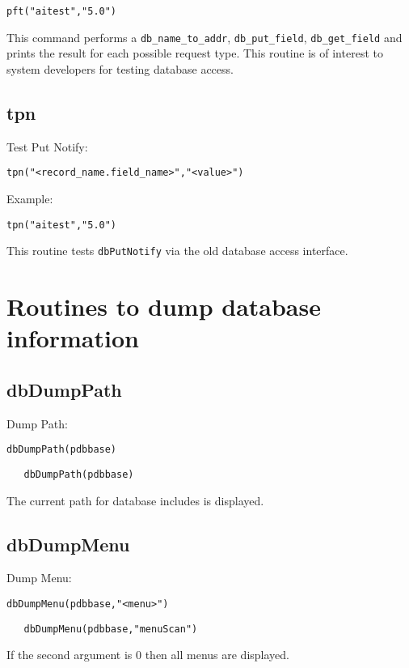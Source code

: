 \begin{verbatim}pft("aitest","5.0")
\end{verbatim}This command performs a \verb|db_name_to_addr|, \verb|db_put_field|, \verb|db_get_field| and prints the result for each 
possible request type. This routine is of interest to system developers for testing database access.

\subsection{tpn}

Test Put Notify:

\begin{verbatim}tpn("<record_name.field_name>","<value>")
\end{verbatim}Example:

\begin{verbatim}tpn("aitest","5.0")
\end{verbatim}This routine tests \verb|dbPutNotify| via the old database access interface.

\section{Routines to dump database information}

\subsection{dbDumpPath}

Dump Path:

\begin{verbatim}dbDumpPath(pdbbase)
\end{verbatim}

\begin{verbatim}   dbDumpPath(pdbbase)
\end{verbatim}The current path for database includes is displayed.

\subsection{dbDumpMenu}

Dump Menu:

\begin{verbatim}dbDumpMenu(pdbbase,"<menu>")
\end{verbatim}

\begin{verbatim}   dbDumpMenu(pdbbase,"menuScan")
\end{verbatim}If the second argument is 0 then all menus are displayed.



